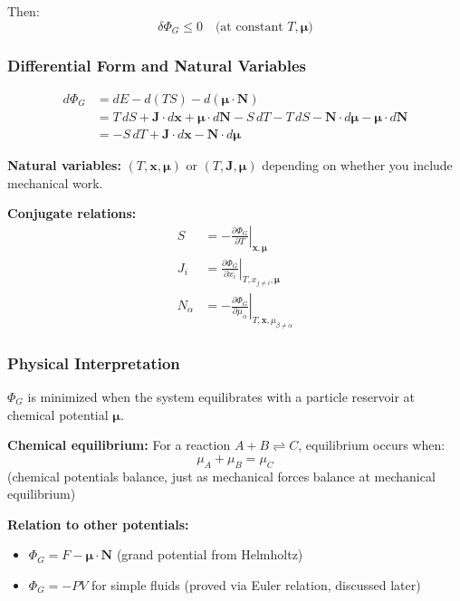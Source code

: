 \documentclass[9pt,twocoloumn]{article}
\begin{document}
Then:
\begin{equation}
\boxed{\delta \Phi_G \leq 0 \quad \text{(at constant } T, \boldsymbol{\mu} \text{)}}
\end{equation}

\subsubsection{Differential Form and Natural Variables}

\begin{align}
d\Phi_G &= dE - d(TS) - d(\boldsymbol{\mu} \cdot \mathbf{N}) \\
&= T \, dS + \mathbf{J} \cdot d\mathbf{x} + \boldsymbol{\mu} \cdot d\mathbf{N} - S \, dT - T \, dS - \mathbf{N} \cdot d\boldsymbol{\mu} - \boldsymbol{\mu} \cdot d\mathbf{N} \\
&= -S \, dT + \mathbf{J} \cdot d\mathbf{x} - \mathbf{N} \cdot d\boldsymbol{\mu}
\end{align}

\textbf{Natural variables:} $(T, \mathbf{x}, \boldsymbol{\mu})$ or $(T, \mathbf{J}, \boldsymbol{\mu})$ depending on whether you include mechanical work.

\textbf{Conjugate relations:}
\begin{align}
S &= -\left. \frac{\partial \Phi_G}{\partial T} \right|_{\mathbf{x}, \boldsymbol{\mu}} \\
J_i &= \left. \frac{\partial \Phi_G}{\partial x_i} \right|_{T, x_{j \neq i}, \boldsymbol{\mu}} \\
N_\alpha &= -\left. \frac{\partial \Phi_G}{\partial \mu_\alpha} \right|_{T, \mathbf{x}, \mu_{\beta \neq \alpha}}
\end{align}

\subsubsection{Physical Interpretation}

$\Phi_G$ is minimized when the system equilibrates with a particle reservoir at chemical potential $\boldsymbol{\mu}$.

\textbf{Chemical equilibrium:} For a reaction $A + B \rightleftharpoons C$, equilibrium occurs when:
\begin{equation}
\mu_A + \mu_B = \mu_C
\end{equation}
(chemical potentials balance, just as mechanical forces balance at mechanical equilibrium)

\textbf{Relation to other potentials:}
\begin{itemize}
    \item $\Phi_G = F - \boldsymbol{\mu} \cdot \mathbf{N}$ (grand potential from Helmholtz)
    \item $\Phi_G = -PV$ for simple fluids (proved via Euler relation, discussed later)
\end{itemize}
\end{document}
